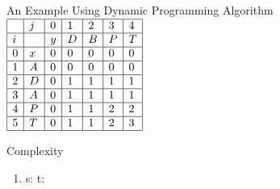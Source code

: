 \documentclass{beamer}
\begin{document}
\begin{frame}{An Example Using Dynamic Programming Algorithm}
\centering
$
\begin{array}{ | l | l | l | l | l | l | l | }
\hline
	 & j & 0 & 1 & 2 & 3 & 4 \\ \hline
	i &  & y & D & B & P & T \\ \hline
	0 & x & 0 & 0 & 0 & 0 & 0 \\ \hline
	1 & A & 0 & 0 & 0 & 0 & 0 \\ \hline
	2 & D & 0 & 1 & 1 & 1 & 1 \\ \hline
	3 & A & 0 & 1 & 1 & 1 & 1 \\ \hline
	4 & P & 0 & 1 & 1 & 2 & 2 \\ \hline
	5 & T & 0 & 1 & 1 & 2 & 3 \\ \hline
\end{array}
$
\end{frame}



\begin{frame}{Complexity}
\begin{enumerate}
    \onslide\item<1-> s: t:
\end{enumerate}
\end{frame}





\end{document}
